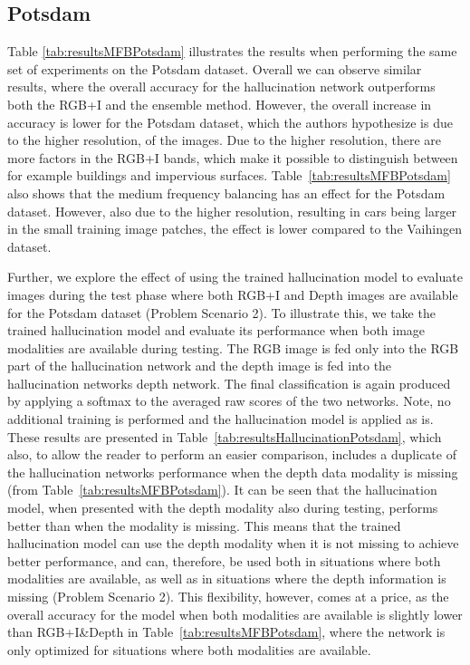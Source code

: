 \documentclass[journal]{IEEEtran}
\begin{document}
\subsection{Potsdam}
\label{sec:potsdam}
Table \ref{tab:resultsMFBPotsdam} illustrates the results when performing the same set of experiments on the Potsdam dataset. Overall we can observe similar results, where the overall accuracy for the hallucination network outperforms both the RGB+I and the ensemble method. However, the overall increase in accuracy is lower for the Potsdam dataset, which the authors hypothesize is due to the higher resolution, of the images. Due to the higher resolution, there are more factors in the RGB+I bands, which make it possible to distinguish between for example buildings and impervious surfaces.
Table~\ref{tab:resultsMFBPotsdam} also shows that the medium frequency balancing has an effect for the Potsdam dataset. However, also due to the higher resolution, resulting in cars being larger in the small training image patches, the effect is lower compared to the Vaihingen dataset.

Further, we explore the effect of using the trained hallucination model to evaluate images during the test phase where both RGB+I and Depth images are available for the Potsdam dataset (Problem Scenario 2). To illustrate this, we take the trained hallucination model and evaluate its performance when both image modalities are available during testing. The RGB image is fed only into the RGB part of the hallucination network and the depth image is fed into the hallucination networks depth network. The final classification is again produced by applying a softmax to the averaged raw scores of the two networks. 
Note, no additional training is performed and the hallucination model is applied as is.
These results are presented in Table~\ref{tab:resultsHallucinationPotsdam}, which also, to allow the reader to perform an easier comparison, includes a duplicate of the hallucination networks performance when the depth data modality is missing (from Table~\ref{tab:resultsMFBPotsdam}). It can be seen that the hallucination model, when presented with the depth modality also during testing, performs better than when the modality is missing. This means that the trained hallucination model can use the depth modality when it is not missing to achieve better performance, and can, therefore, be used both in situations where both modalities are available, as well as in situations where the depth information is missing (Problem Scenario 2). This flexibility, however, comes at a price, as the overall accuracy for the model when both modalities are available is slightly lower than RGB+I\&Depth in Table~\ref{tab:resultsMFBPotsdam}, where the network is only optimized for situations where both modalities are available.
\end{document}
